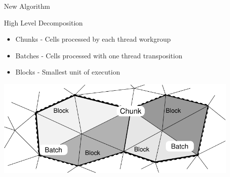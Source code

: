 \begin{frame}{New Algorithm}

 \begin{block}{High Level Decomposition}
  \begin{itemize}
   \item Chunks  \hspace*{0.11cm} - \hspace*{0.05cm} Cells processed by each thread workgroup
   \item Batches \hspace*{0.05cm}  - \hspace*{0.05cm} Cells processed with one thread transposition
   \item Blocks  \hspace*{0.28cm} - \hspace*{0.05cm} Smallest unit of execution
  \end{itemize}
 \end{block}
 
 \begin{center}
  \includegraphics[width=0.9\textwidth]{figures/chunk-batch-block}
 \end{center}

\end{frame}
